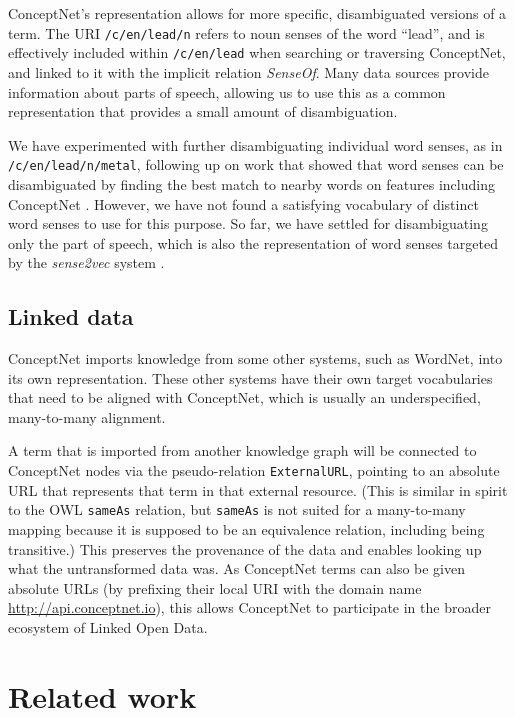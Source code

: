 \documentclass[letterpaper]{article}
\begin{document}
ConceptNet's representation allows for more specific, disambiguated
versions of a term. The URI \texttt{/c/en/lead/n} refers to noun senses
of the word ``lead'', and is effectively included within
\texttt{/c/en/lead} when searching or traversing ConceptNet, and
linked to it with the implicit relation \emph{SenseOf}. Many data
sources provide information about parts of speech, allowing us to use
this as a common representation that provides a small amount of
disambiguation.

We have experimented with further disambiguating individual word senses, as in
\texttt{/c/en/lead/n/metal}, following up on work that showed that word senses
can be disambiguated by finding the best match to nearby words on features
including ConceptNet \cite{havasi2010coarse}. However, we have not found a
satisfying vocabulary of distinct word senses to use for this purpose. So far,
we have settled for disambiguating only the part of speech, which is also the
representation of word senses targeted by the \emph{sense2vec} system
\cite{trask2015sense2vec}.

\subsection{Linked data}

ConceptNet imports knowledge from some other systems, such as WordNet, into its
own representation. These other systems have their own target vocabularies that
need to be aligned with ConceptNet, which is usually an underspecified,
many-to-many alignment.

A term that is imported from another knowledge graph will be connected to
ConceptNet nodes via the pseudo-relation \texttt{ExternalURL}, pointing to an
absolute URL that represents that term in that external resource. (This is
similar in spirit to the OWL \texttt{sameAs} relation, but \texttt{sameAs} is
not suited for a many-to-many mapping because it is supposed to be an
equivalence relation, including being transitive.) This preserves the
provenance of the data and enables looking up what the untransformed data was.
As ConceptNet terms can also be given absolute URLs (by prefixing their local
URI with the domain name \url{http://api.conceptnet.io}), this allows
ConceptNet to participate in the broader ecosystem of Linked Open Data.

\section{Related work}
\end{document}

